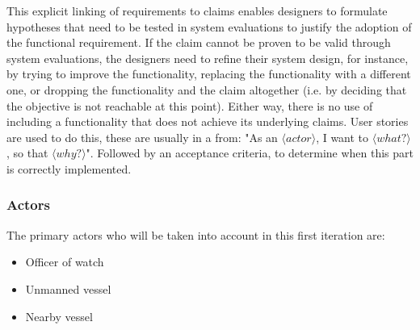 This explicit linking of requirements to claims enables designers to formulate hypotheses that need to be tested in system evaluations to justify the adoption of the functional requirement. If the claim cannot be proven to be valid through system evaluations, the designers need to refine their system design, for instance, by trying to improve the functionality, replacing the functionality with a different one, or dropping the functionality and the claim altogether (i.e. by deciding that the objective is not reachable at this point). Either way, there is no use of including a functionality that does not achieve its underlying claims. User stories are used to do this, these are usually in a from: "As an $\langle actor \rangle$, I want to $\langle what? \rangle$, so that $\langle why? \rangle$". Followed by an acceptance criteria, to determine when this part is correctly implemented.

\subsubsection{Actors}
The primary actors who will be taken into account in this first iteration are:
\begin{itemize}
	\item Officer of watch
	\item Unmanned vessel
	\item Nearby vessel
\end{itemize}


